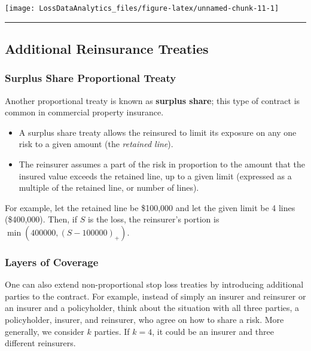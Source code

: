 \documentclass[]{book}
\providecommand{\tightlist}{%
  \setlength{\itemsep}{0pt}\setlength{\parskip}{0pt}}
\theoremstyle{definition}
\theoremstyle{definition}
\theoremstyle{definition}
\theoremstyle{remark}
\begin{document}
\begin{center}\texttt{[image: LossDataAnalytics\_files/figure-latex/unnamed-chunk-11-1]} \end{center}

\begin{center}\rule{0.5\linewidth}{\linethickness}\end{center}

\subsection{Additional Reinsurance Treaties}\label{S:AdditionalRe}

\subsubsection{Surplus Share Proportional
Treaty}\label{surplus-share-proportional-treaty}

Another proportional treaty is known as \textbf{surplus share}; this
type of contract is common in commercial property insurance.

\begin{itemize}
\tightlist
\item
  A surplus share treaty allows the reinsured to limit its exposure on
  any one risk to a given amount (the \emph{retained line}).
\item
  The reinsurer assumes a part of the risk in proportion to the amount
  that the insured value exceeds the retained line, up to a given limit
  (expressed as a multiple of the retained line, or number of lines).
\end{itemize}

For example, let the retained line be \$100,000 and let the given limit
be 4 lines (\$400,000). Then, if \(S\) is the loss, the reinsurer's
portion is \(\min(400000, (S-100000)_+)\).

\subsubsection{Layers of Coverage}\label{layers-of-coverage}

One can also extend non-proportional stop loss treaties by introducing
additional parties to the contract. For example, instead of simply an
insurer and reinsurer or an insurer and a policyholder, think about the
situation with all three parties, a policyholder, insurer, and
reinsurer, who agree on how to share a risk. More generally, we consider
\(k\) parties. If \(k=4\), it could be an insurer and three different
reinsurers.
\end{document}
